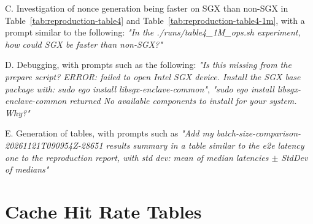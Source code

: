 \documentclass[a4paper]{article}
\begin{document}
C. Investigation of nonce generation being faster on SGX than non-SGX in Table~\ref{tab:reproduction-table4} and Table~\ref{tab:reproduction-table4-1m}, with a prompt similar to the following: \textit{"In the ./runs/table4\_1M\_ops.sh experiment, how could SGX be faster than non-SGX?"}

D. Debugging, with prompts such as the following: \textit{"Is this missing from the prepare script? ERROR: failed to open Intel SGX device. Install the SGX base package with: sudo ego install libsgx-enclave-common"}, \textit{"sudo ego install libsgx-enclave-common returned No available components to install for your system. Why?"}

E. Generation of tables, with prompts such as \textit{"Add my batch-size-comparison-20261121T090954Z-28651 results summary in a table similar to the e2e latency one to the reproduction report, with std dev: mean of median latencies $\pm$ StdDev of medians"}






\appendix
\section{Cache Hit Rate Tables}
\label{app:cache-hit-rates}



\end{document}
